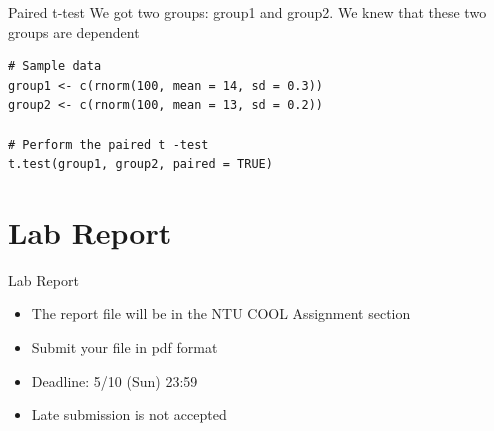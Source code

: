 \documentclass[aspectratio=169]{beamer}
\begin{document}
\begin{frame}[fragile]{Paired t-test}
We got two groups: group1 and group2.
We knew that these two groups are dependent
\begin{lstlisting}
# Sample data
group1 <- c(rnorm(100, mean = 14, sd = 0.3))
group2 <- c(rnorm(100, mean = 13, sd = 0.2))

# Perform the paired t -test
t.test(group1, group2, paired = TRUE)
\end{lstlisting}
\end{frame}

\section{Lab Report}
\begin{frame}{Lab Report}
\begin{itemize}
    \item The report file will be in the NTU COOL Assignment section
    \item Submit your file in pdf format
    \item Deadline: 5/10 (Sun) 23:59
    \item Late submission is not accepted
\end{itemize}
\end{frame}
\end{document}
